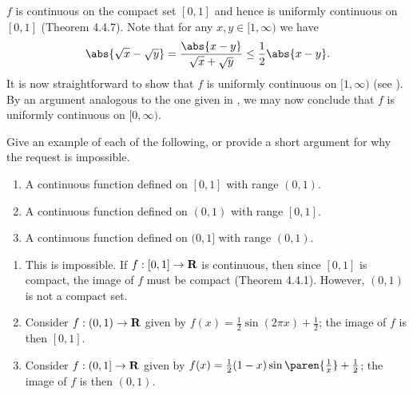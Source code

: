 \documentclass{lew98_solutions}
\begin{document}
\begin{solution}
    \( f \) is continuous on the compact set \( [0, 1] \) and hence is uniformly continuous on \( [0, 1] \) (Theorem 4.4.7). Note that for any \( x, y \in [1, \infty) \) we have
    \[
        \abs{\sqrt{x} - \sqrt{y}} = \frac{\abs{x - y}}{\sqrt{x} + \sqrt{y}} \leq \frac{1}{2} \abs{x - y}.
    \]
    It is now straightforward to show that \( f \) is uniformly continuous on \( [1, \infty) \) (see ). By an argument analogous to the one given in , we may now conclude that \( f \) is uniformly continuous on \( [0, \infty) \).
\end{solution}

\begin{exercise}
\label{ex:4.4.8}
    Give an example of each of the following, or provide a short argument for why the request is impossible.
    \begin{enumerate}
        \item A continuous function defined on \( [0, 1] \) with range \( (0, 1) \).

        \item A continuous function defined on \( (0, 1) \) with range \( [0, 1] \).

        \item A continuous function defined on \( (0, 1] \) with range \( (0, 1) \).
    \end{enumerate}
\end{exercise}

\begin{solution}
    \begin{enumerate}
        \item This is impossible. If \( f : [0, 1] \to \mathbf{R} \) is continuous, then since \( [0, 1] \) is compact, the image of \( f \) must be compact (Theorem 4.4.1). However, \( (0, 1) \) is not a compact set.

        \item Consider \( f : (0, 1) \to \mathbf{R} \) given by \( f(x) = \tfrac{1}{2} \sin (2 \pi x) + \tfrac{1}{2} \); the image of \( f \) is then \( [0, 1] \).

        \item Consider \( f : (0, 1] \to \mathbf{R} \) given by \( f(x) = \tfrac{1}{2} (1 - x) \sin \paren{ \tfrac{1}{x} } + \tfrac{1}{2} \); the image of \( f \) is then \( (0, 1) \).
    \end{enumerate}
\end{solution}
\end{document}
